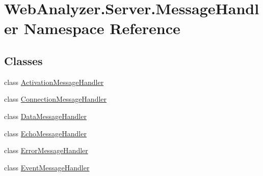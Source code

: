 \hypertarget{namespace_web_analyzer_1_1_server_1_1_message_handler}{}\section{Web\+Analyzer.\+Server.\+Message\+Handler Namespace Reference}
\label{namespace_web_analyzer_1_1_server_1_1_message_handler}
\subsection*{Classes}
\begin{DoxyCompactItemize}
\item 
class \hyperlink{class_web_analyzer_1_1_server_1_1_message_handler_1_1_activation_message_handler}{Activation\+Message\+Handler}
\item 
class \hyperlink{class_web_analyzer_1_1_server_1_1_message_handler_1_1_connection_message_handler}{Connection\+Message\+Handler}
\item 
class \hyperlink{class_web_analyzer_1_1_server_1_1_message_handler_1_1_data_message_handler}{Data\+Message\+Handler}
\item 
class \hyperlink{class_web_analyzer_1_1_server_1_1_message_handler_1_1_echo_message_handler}{Echo\+Message\+Handler}
\item 
class \hyperlink{class_web_analyzer_1_1_server_1_1_message_handler_1_1_error_message_handler}{Error\+Message\+Handler}
\item 
class \hyperlink{class_web_analyzer_1_1_server_1_1_message_handler_1_1_event_message_handler}{Event\+Message\+Handler}
\end{DoxyCompactItemize}
